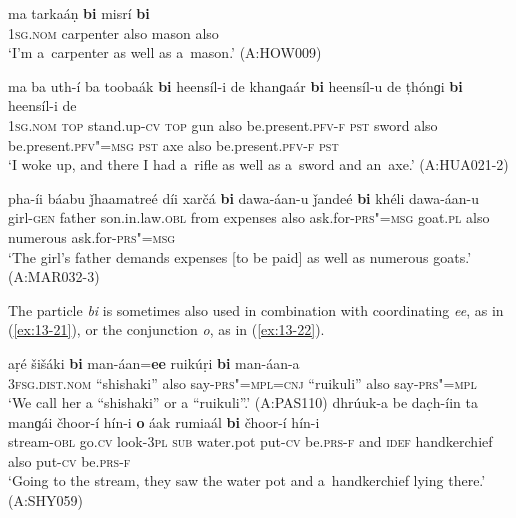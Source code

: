 \begin{exe}
\ex
\label{ex:13-18}
\gll ma {\ob}tarkaáṇ \textbf{bi} misrí \textbf{bi}{\cb}\\
\textsc{1sg.nom} carpenter also mason also \\
\glt `I'm a~carpenter as well as a~mason.' (A:HOW009)

\ex
\label{ex:13-19}
\gll ma ba uth-í ba {\ob}toobaák \textbf{bi} heensíl-i de khanɡaár \textbf{bi} heensíl-u de ṭhónɡi \textbf{bi} heensíl-i de{\cb}\\
\textsc{1sg.nom} \textsc{top} stand.up-\textsc{cv} \textsc{top} gun also  be.present.\textsc{pfv-f} \textsc{pst} sword also be.present.\textsc{pfv"=msg } \textsc{pst} axe also be.present.\textsc{pfv-f } \textsc{pst} \\
\glt `I woke up, and there I had a~rifle as well as a~sword and an~axe.' (A:HUA021-2)

\ex
\label{ex:13-20}
\gll pha-íi báabu ǰhaamatreé díi {\ob}xarčá \textbf{bi} dawa-áan-u ǰandeé \textbf{bi} khéli dawa-áan-u{\cb}\\
girl-\textsc{gen} father son.in.law.\textsc{obl} from expenses also  ask.for-\textsc{prs"=msg} goat.\textsc{pl} also numerous ask.for-\textsc{prs"=msg} \\
\glt `The girl's father demands expenses [to be paid] as well as numerous goats.' (A:MAR032-3) 
\end{exe}

The particle \textit{bi} is sometimes also used in combination with coordinating \textit{ee}, as in (\ref{ex:13-21}), or the conjunction \textit{o}, as in (\ref{ex:13-22}).

\ea
\label{ex:13-21}
\gll aṛé {\ob}šišáki \textbf{bi} man-áan=\textbf{ee} ruikúṛi \textbf{bi} man-áan-a{\cb}\\
\textsc{3fsg.dist.nom} ``shishaki'' also say-\textsc{prs"=mpl=cnj}  ``ruikuli'' also say-\textsc{prs"=mpl}\\
\glt `We call her a ``shishaki'' or a ``ruikuli''.' (A:PAS110)
\ex
\label{ex:13-22}
\gll dhrúuk-a be dac̣h-íin ta {\ob}manɡái čhoor-í hín-i \textbf{o} áak rumiaál \textbf{bi} čhoor-í hín-i{\cb}\\
stream-\textsc{obl} go.\textsc{cv} look-\textsc{3pl} \textsc{sub} water.pot put-\textsc{cv}  be.\textsc{prs-f} and \textsc{idef } handkerchief also put-\textsc{cv} be.\textsc{prs-f } \\
\glt `Going to the stream, they saw the water pot and a~handkerchief lying there.' (A:SHY059) 
\z

